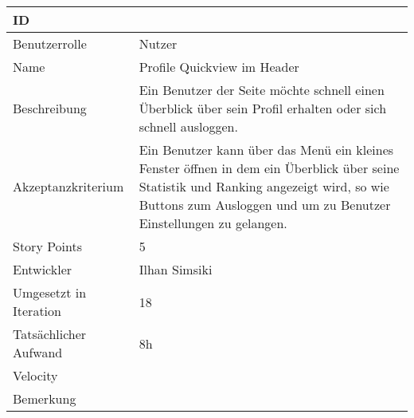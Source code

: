 \begin{tabularx}{\textwidth}{|p{}|X|}
	\hline
	ID & \\
	\hline
	Benutzerrolle & Nutzer\\
	\hline
	Name & Profile Quickview im Header\\
	\hline
	Beschreibung & Ein Benutzer der Seite möchte schnell einen Überblick über sein Profil erhalten oder sich schnell ausloggen.\\
	\hline
	Akzeptanzkriterium & Ein Benutzer kann über das Menü ein kleines Fenster öffnen in dem ein Überblick über seine Statistik und Ranking angezeigt wird, so wie Buttons zum Ausloggen und um zu Benutzer Einstellungen zu gelangen.\\
	\hline
	Story Points & 5\\
	\hline
	Entwickler & Ilhan Simsiki\\
	\hline
	Umgesetzt in Iteration & 18\\
	\hline
	Tatsächlicher Aufwand & 8h\\
	\hline
	Velocity & \\
	\hline
	Bemerkung & \\
	\hline
\end{tabularx}
\vspace{20pt}
